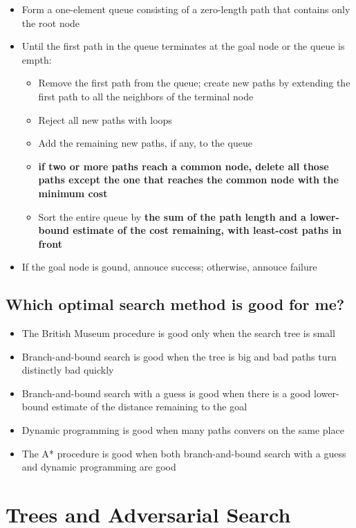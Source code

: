 \documentclass{article}
\begin{document}
\begin{itemize}
  \item Form a one-element queue consisting of a zero-length path 
    that contains only the root node
  \item Until the first path in the queue terminates at the 
    goal node or the queue is empth:
    \begin{itemize}
      \item Remove the first path from the queue; create new paths 
        by extending the first path to all the neighbors
        of the terminal node
      \item Reject all new paths with loops
      \item Add the remaining new paths, if any, to the queue
      \item \textbf{if two or more paths reach a common node,
        delete all those paths except the one that reaches the
        common node with the minimum cost}
      \item Sort the entire queue by \textbf{the sum of the path
        length and a lower-bound estimate of the cost
        remaining, with least-cost paths in front}
    \end{itemize}
  \item If the goal node is gound, annouce success; otherwise, 
    annouce failure
\end{itemize}

\subsection{Which optimal search method is good for me?}
\begin{itemize}
  \item The British Museum procedure is good only when the 
    search tree is small
  \item Branch-and-bound search is good when the tree is big 
    and bad paths turn distinctly bad quickly
  \item Branch-and-bound search with a guess is good when 
    there is a good lower-bound estimate of the distance
    remaining to the goal
  \item Dynamic programming is good when many paths convers
    on the same place
  \item The A* procedure is good when both branch-and-bound 
    search with a guess and dynamic programming are good
\end{itemize}

\section{Trees and Adversarial Search}
\end{document}
